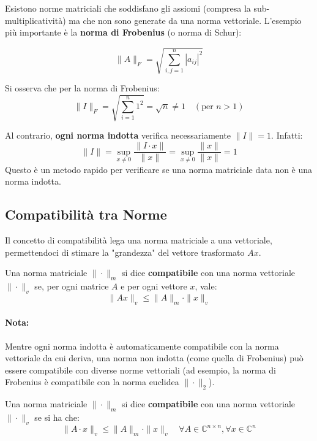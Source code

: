 \documentclass[a4paper,12pt]{article}
\begin{document}
	Esistono norme matriciali che soddisfano gli assiomi (compresa la sub-multiplicatività) ma che non sono generate da una norma vettoriale. L'esempio più importante è la \textbf{norma di Frobenius} (o norma di Schur):
	
	\begin{equation}
		\|A\|_F = \sqrt{\sum_{i,j=1}^{n} |a_{ij}|^2}
	\end{equation}
	
	\begin{tcolorbox}[title=Osservazione: Norma dell'identità, colback=white]
		Si osserva che per la norma di Frobenius:
		\[ \|I\|_F = \sqrt{\sum_{i=1}^n 1^2} = \sqrt{n} \neq 1 \quad (\text{per } n > 1) \]
		
		Al contrario, \textbf{ogni norma indotta} verifica necessariamente $\|I\| = 1$. Infatti:
		\[ \|I\| = \sup_{x \neq 0} \frac{\|I \cdot x\|}{\|x\|} = \sup_{x \neq 0} \frac{\|x\|}{\|x\|} = 1 \]
		Questo è un metodo rapido per verificare se una norma matriciale data non è una norma indotta.
	\end{tcolorbox}
	
	\subsection{Compatibilità tra Norme}
	
	Il concetto di compatibilità lega una norma matriciale a una vettoriale, permettendoci di stimare la "grandezza" del vettore trasformato $Ax$.
	
	\begin{tcolorbox}[title=Definizione: Norma Compatibile, colback=blue!5!white]
		Una norma matriciale $\|\cdot\|_m$ si dice \textbf{compatibile} con una norma vettoriale $\|\cdot\|_v$ se, per ogni matrice $A$ e per ogni vettore $x$, vale:
		\begin{equation}
			\|Ax\|_v \le \|A\|_m \cdot \|x\|_v
		\end{equation}
	\end{tcolorbox}
	
	
	\paragraph{Nota:} 
	Mentre ogni norma indotta è automaticamente compatibile con la norma vettoriale da cui deriva, una norma non indotta (come quella di Frobenius) può essere compatibile con diverse norme vettoriali (ad esempio, la norma di Frobenius è compatibile con la norma euclidea $\|\cdot\|_2$).
	\begin{tcolorbox}[title=Definizione: Norma Matriciale Compatibile, colback=blue!5!white, colframe=blue!75!black]
		Una norma matriciale $\|\cdot\|_m$ si dice \textbf{compatibile} con una norma vettoriale $\|\cdot\|_v$ se si ha che:
		\begin{equation}
			\|A \cdot x\|_v \le \|A\|_m \cdot \|x\|_v \quad \forall A \in \mathbb{C}^{n \times n}, \forall x \in \mathbb{C}^n
		\end{equation}
	\end{tcolorbox}
	
\end{document}
